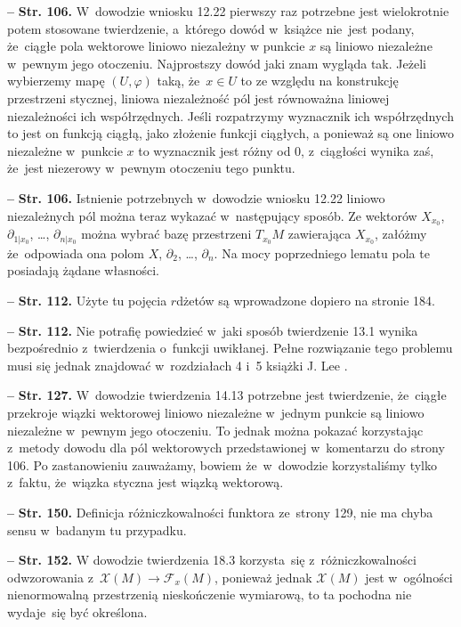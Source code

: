 \documentclass[a4paper,11pt]{article}
\newcommand{\tb}{\textbf}
\newcommand{\noi}{\noindent}
\newcommand{\start}{\noi \tb{--} {}}
\newcommand{\Str}[1]{\tb{Str. #1.}}
\begin{document}
\start \Str{106} W~dowodzie wniosku 12.22 pierwszy raz potrzebne jest
wielokrotnie potem stosowane twierdzenie, a~którego dowód w~książce
nie~jest podany, że~ciągłe pola wektorowe liniowo niezależny w punkcie
$x$ są liniowo niezależne w~pewnym jego otoczeniu. Najprostszy dowód
jaki znam wygląda tak. Jeżeli wybierzemy mapę $( U, \varphi )$ taką,
że~$x \in U$ to ze względu na konstrukcję przestrzeni stycznej,
liniowa niezależność pól jest równoważna liniowej niezależności ich
współrzędnych. Jeśli rozpatrzymy wyznacznik ich współrzędnych to jest
on funkcją ciągłą, jako złożenie funkcji ciągłych, a ponieważ są one
liniowo niezależne w~punkcie $x$ to wyznacznik jest różny od 0,
z~ciągłości wynika zaś, że~jest niezerowy w~pewnym otoczeniu tego
punktu.

\start \Str{106} Istnienie potrzebnych w~dowodzie wniosku 12.22
liniowo niezależnych pól można teraz wykazać w~następujący sposób. Ze
wektorów $X_{ x_{ 0 } }$, $\partial_{ 1 | { x_{ 0 } } }$, \ldots,
$\partial_{ n | { x_{ 0 } } }$ można wybrać bazę przestrzeni
$T_{ { x_{ 0 } } }M$ zawierająca $X_{ { x_{ 0 } } }$, załóżmy
że~odpowiada ona polom $X$, $\partial_{ 2 }$, \ldots,
$\partial_{ n }$. Na mocy poprzedniego lematu pola te posiadają żądane
własności.

\start \Str{112} Użyte tu pojęcia $r$\dywiz dżetów są wprowadzone
dopiero na stronie 184.

\start \Str{112} Nie potrafię powiedzieć w~jaki sposób twierdzenie
13.1 wynika bezpośrednio z~twierdzenia o~funkcji uwikłanej. Pełne
rozwiązanie tego problemu musi się jednak znajdować w~rozdziałach 4
i~5 książki J. Lee \cite{Lee13}.

\start \Str{127} W~dowodzie twierdzenia 14.13 potrzebne jest
twierdzenie, że~ciągłe przekroje wiązki wektorowej liniowo niezależne
w~jednym punkcie są liniowo niezależne w~pewnym jego otoczeniu. To
jednak można pokazać korzystając z~metody dowodu dla pól wektorowych
przedstawionej w~komentarzu do strony 106. Po zastanowieniu zauważamy,
bowiem że~w~dowodzie korzystaliśmy tylko z~faktu, że~wiązka styczna
jest wiązką wektorową.

\start \Str{150} Definicja różniczkowalności funktora ze~strony 129,
nie ma chyba sensu w~badanym tu przypadku.

\start \Str{152} W dowodzie twierdzenia 18.3 korzysta~się
z~różniczkowalności odwzorowania
z~$\mathcal{X}( M ) \rightarrow \mathcal{F}_{ x }( M )$, ponieważ
jednak $\mathcal{X}( M )$ jest w~ogólności nienormowalną przestrzenią
nieskończenie wymiarową, to ta pochodna nie wydaje~się być określona.
\end{document}
